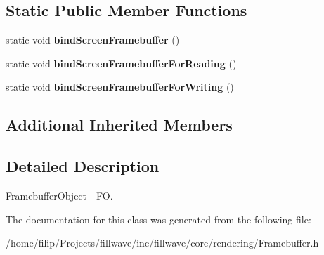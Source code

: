\subsection*{Static Public Member Functions}
\begin{DoxyCompactItemize}
\item 
\hypertarget{classfillwave_1_1core_1_1Framebuffer_afebebaa9b9a6a5d9ab4ade9f669258b9}{}static void {\bfseries bind\+Screen\+Framebuffer} ()\label{classfillwave_1_1core_1_1Framebuffer_afebebaa9b9a6a5d9ab4ade9f669258b9}

\item 
\hypertarget{classfillwave_1_1core_1_1Framebuffer_a4402d0803909593d64e52ca3cb228bbf}{}static void {\bfseries bind\+Screen\+Framebuffer\+For\+Reading} ()\label{classfillwave_1_1core_1_1Framebuffer_a4402d0803909593d64e52ca3cb228bbf}

\item 
\hypertarget{classfillwave_1_1core_1_1Framebuffer_aa614fc524a61de7839fd7cca66c38543}{}static void {\bfseries bind\+Screen\+Framebuffer\+For\+Writing} ()\label{classfillwave_1_1core_1_1Framebuffer_aa614fc524a61de7839fd7cca66c38543}

\end{DoxyCompactItemize}
\subsection*{Additional Inherited Members}


\subsection{Detailed Description}
Framebuffer\+Object -\/ F\+O. 

The documentation for this class was generated from the following file\+:\begin{DoxyCompactItemize}
\item 
/home/filip/\+Projects/fillwave/inc/fillwave/core/rendering/Framebuffer.\+h\end{DoxyCompactItemize}
